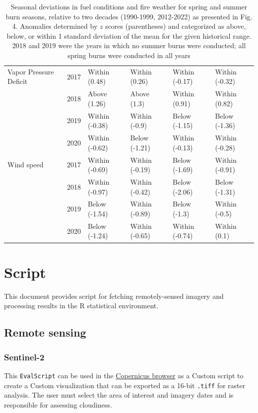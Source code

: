 \documentclass[
]{article}
\begin{document}
\begin{table}[ht]
\begin{tabular}{llllll}
  Vapor Pressure Deficit & 2017 & Within (0.48) & Within (0.26) & Within (-0.17) & Within (-0.32) \\ 
    & 2018 & Above (1.26) & Above (1.3) & Within (0.91) & Within (0.82) \\ 
    & 2019 & Within (-0.38) & Within (-0.9) & Below (-1.15) & Below (-1.36) \\ 
    & 2020 & Within (-0.62) & Below (-1.21) & Within (-0.13) & Within (-0.28) \\ 
  Wind speed & 2017 & Within (-0.69) & Within (-0.19) & Below (-1.69) & Within (-0.91) \\ 
    & 2018 & Within (-0.97) & Within (-0.42) & Below (-2.06) & Below (-1.31) \\ 
    & 2019 & Below (-1.54) & Within (-0.89) & Below (-1.3) & Within (-0.5) \\ 
    & 2020 & Below (-1.24) & Within (-0.65) & Within (-0.74) & Within (0.1) \\ 
   \hline
\end{tabular}
\caption{Seasonal deviations in fuel conditions and fire weather for spring and summer burn seasons, relative to two decades (1990-1999, 2012-2022) as presented in Fig. 4. Anomalies determined by $z$ scores (parentheses) and categorized as above, below, or within 1 standard deviation of the mean for the given historical range. 2018 and 2019 were the years in which no summer burns were conducted; all spring burns were conducted in all years} 
\end{table}

\newpage

\section{Script}\label{script}

This document provides script for fetching remotely-sensed imagery and
processing results in the \textsf{R} statistical environment.

\subsection{Remote sensing}\label{remote-sensing}

\subsubsection{Sentinel-2}\label{sentinel-2}

This \texttt{EvalScript} can be used in the
\href{https://browser.dataspace.copernicus.eu/}{Copernicus browser} as a
Custom script to create a Custom visualization that can be exported as a
16-bit \texttt{.tiff} for raster analysis. The user must select the area
of interest and imagery dates and is responsible for assessing
cloudiness.
\end{document}
